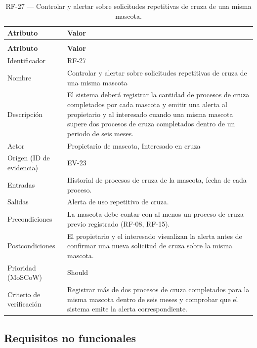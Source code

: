 \documentclass[journal,onecolumn]{IEEEtran}
\makeatletter
\newenvironment{atributos}[2]{%
	\small
	\begin{longtable}{@{}>{\raggedright\arraybackslash}p{4.2cm} >{\raggedright\arraybackslash}p{11.2cm}@{}}
		\caption{#2}\label{tab:#1}\\
		\toprule
		\textbf{Atributo} & \textbf{Valor} \\
		\midrule
		\endfirsthead
		\multicolumn{2}{@{}l}{\small\itshape (continuación)}\\
		\toprule
		\textbf{Atributo} & \textbf{Valor} \\
		\midrule
		\endhead
		\bottomrule
		\endlastfoot
	}{%
	\end{longtable}
	\normalsize
}
\makeatother
\begin{document}
	\begin{atributos}{RF-27}{RF-27 --- Controlar y alertar sobre solicitudes repetitivas de cruza de una misma mascota.}
		Identificador & RF-27 \\
		Nombre & Controlar y alertar sobre solicitudes repetitivas de cruza de una misma mascota \\
		Descripción & El sistema deberá registrar la cantidad de procesos de cruza completados por cada mascota y emitir una alerta al propietario y al interesado cuando una misma mascota supere dos procesos de cruza completados dentro de un periodo de seis meses. \\
		Actor & Propietario de mascota, Interesado en cruza \\
		Origen (ID de evidencia) & EV-23 \\
		Entradas & Historial de procesos de cruza de la mascota, fecha de cada proceso. \\
		Salidas & Alerta de uso repetitivo de cruza. \\
		Precondiciones & La mascota debe contar con al menos un proceso de cruza previo registrado (RF-08, RF-15). \\
		Postcondiciones & El propietario y el interesado visualizan la alerta antes de confirmar una nueva solicitud de cruza sobre la misma mascota. \\
		Prioridad (MoSCoW) & Should \\
		Criterio de verificación & Registrar más de dos procesos de cruza completados para la misma mascota dentro de seis meses y comprobar que el sistema emite la alerta correspondiente. \\
	\end{atributos}
	\subsection{Requisitos no funcionales}
	\label{sec:rnf}
	
\end{document}
